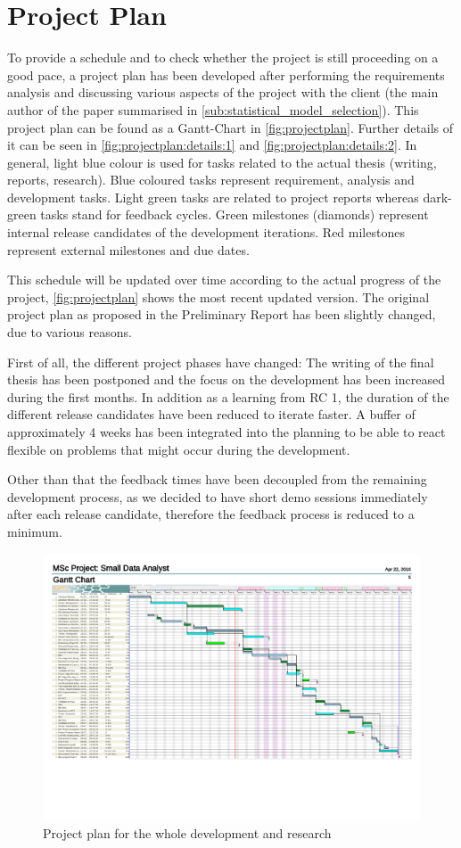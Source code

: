\section{Project Plan}
\label{sec:projectplan}
To provide a schedule and to check whether the project is still proceeding on a good pace, a project plan has been developed after performing the requirements analysis and discussing various aspects of the project with the client (the main author of the paper summarised in \autoref{sub:statistical_model_selection}). This project plan can be found as a Gantt-Chart in \autoref{fig:projectplan}. Further details of it can be seen in \autoref{fig:projectplan:details:1} and \autoref{fig:projectplan:details:2}. In general, light blue colour is used for tasks related to the actual thesis (writing, reports, research). Blue coloured tasks represent requirement, analysis and development tasks. Light green tasks are related to project reports whereas dark-green tasks stand for feedback cycles. Green milestones (diamonds) represent internal release candidates of the development iterations. Red milestones represent external milestones and due dates. 

This schedule will be updated over time according to the actual progress of the project, \autoref{fig:projectplan} shows the most recent updated version. 
The original project plan as proposed in the Preliminary Report has been slightly changed, due to various reasons. 

First of all, the different project phases have changed: The writing of the final thesis has been postponed and the focus on the development has been increased during the first months. In addition as a learning from RC 1, the duration of the different release candidates have been reduced to iterate faster. A buffer of approximately 4 weeks has been integrated into the planning to be able to react flexible on problems that might occur during the development. 

Other than that the feedback times have been decoupled from the remaining development process, as we decided to have short demo sessions immediately after each release candidate, therefore the feedback process is reduced to a minimum.

\begin{figure}
	\centering
	\includegraphics[page=1,width=\textwidth]{appendix/Projectplan.pdf}
	\caption{Project plan for the whole development and research}
	\label{fig:projectplan}
\end{figure}
